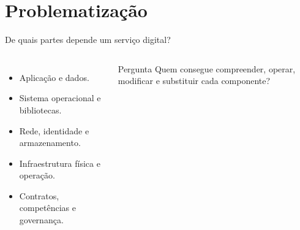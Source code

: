 \section{Problematização}

\begin{frame}{De quais partes depende um serviço digital?}
  \begin{columns}[T,onlytextwidth]
      \begin{itemize}
        \item Aplicação e dados.
        \item Sistema operacional e bibliotecas.
        \item Rede, identidade e armazenamento.
        \item Infraestrutura física e operação.
        \item Contratos, competências e governança.
      \end{itemize}
      \begin{block}{Pergunta}
        Quem consegue compreender, operar, modificar e substituir cada componente?
      \end{block}
  \end{columns}
\end{frame}

